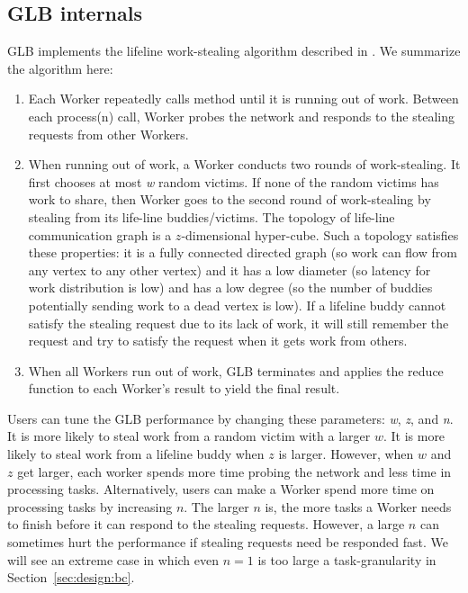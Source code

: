\subsection{GLB internals}
\label{sec:design:internals}
GLB implements the lifeline work-stealing algorithm described in \cite{glb}. We summarize the algorithm here:
\begin{enumerate}
\item
Each Worker repeatedly calls  method until it is running out of work. Between each process(n) call, Worker probes the network and responds to the stealing requests from other Workers. 
\item
When running out of work, a Worker conducts two rounds of work-stealing. It first chooses at most \textit{w} random victims. If none of the random victims has work to share, then Worker goes to the second round of work-stealing by stealing from its life-line buddies/victims. The topology of life-line communication graph is a $z$-dimensional hyper-cube. Such a topology satisfies these properties: it is a fully connected directed graph (so
work can flow from any vertex to any other vertex) and it has a low
diameter (so latency for work distribution is low) and has a low
degree (so the number of buddies potentially sending work to a dead
vertex is low). If a lifeline buddy cannot satisfy the stealing request due to its lack of work, it will still remember the request and try to satisfy the request when it gets work from others.   
\item
When all Workers run out of work, GLB terminates and applies the reduce function to each Worker's result to yield the final result.
\end{enumerate}

Users can tune the GLB performance by changing these parameters:
\textit{w}, \textit{z}, and \textit{n}. It is more likely to steal
work from a random victim with a larger $w$. It is more likely to
steal work from a lifeline buddy when $z$ is larger. However, when $w$
and $z$ get larger, each worker spends more time probing the network and less time in processing tasks. Alternatively, users can make a Worker spend more time on processing tasks by increasing $n$. The larger $n$ is, the more tasks a Worker needs to finish before it can respond to the stealing requests. However, a large $n$ can sometimes hurt the performance if stealing requests need be responded fast. We will see an extreme case in which even $n=1$ is too large a task-granularity in Section~\ref{sec:design:bc}.

